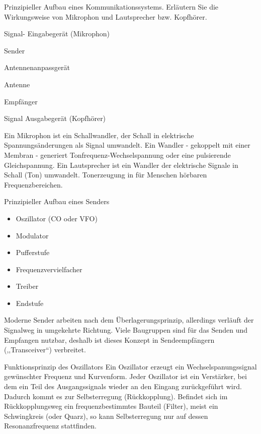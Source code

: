 \documentclass[avery5371,grid,frame,a4paper]{flashcards}
\newcommand{\card}[3]{
  \begin{flashcard}[{\chap} -- #1]{#2}#3\end{flashcard}
}
\begin{document}
\card{09}{Prinzipieller Aufbau eines Kommunikationssystems. Erläutern Sie die Wirkungsweise von Mikrophon und Lautsprecher bzw. Kopfhörer.}{
  \small
  \begin{itemize*}
    \item Signal- Eingabegerät (Mikrophon)
    \item Sender
    \item Antennenanpassgerät
    \item Antenne
    \item Empfänger
    \item Signal Ausgabegerät (Kopfhörer)
  \end{itemize*}
  \vspace{10pt}

  Ein Mikrophon ist ein Schallwandler, der Schall in elektrische Spannungsänderungen als Signal umwandelt. Ein Wandler - gekoppelt mit einer Membran - generiert Tonfrequenz-Wechselspannung oder eine pulsierende Gleichspannung. Ein Lautsprecher ist ein Wandler der elektrische Signale in Schall (Ton) umwandelt. Tonerzeugung in für Menschen hörbaren Frequenzbereichen.
}
\card{11}{Prinzipieller Aufbau eines Senders}{
  \small
  \begin{minipage}{0.4\textwidth}
  \begin{itemize}
    \item Oszillator (CO oder VFO)
    \item Modulator
    \item Pufferstufe
  \end{itemize}
  \end{minipage}
  \begin{minipage}{0.5\textwidth}
  \begin{itemize}
    \item Frequenzvervielfacher
    \item Treiber
    \item Endstufe
  \end{itemize}
  \end{minipage}
  \vspace{10pt}

  Moderne Sender arbeiten nach dem Überlagerungsprinzip, allerdings verläuft der Signalweg in umgekehrte Richtung. Viele Baugruppen sind für das Senden und Empfangen nutzbar, deshalb ist dieses Konzept in Sendeempfängern (,,Transceiver``) verbreitet.
}
\card{12}{Funktionsprinzip des Oszillators}{
  Ein Oszillator erzeugt ein Wechselspanungssignal gewünschter Frequenz und Kurvenform.
  Jeder Oszillator ist ein Verstärker, bei dem ein Teil des Ausgangssignals wieder an den Eingang zurückgeführt wird. Dadurch kommt es zur Selbsterregung (Rückkopplung). Befindet sich im Rückkopplungsweg ein frequenzbestimmtes Bauteil (Filter), meist ein Schwingkreis (oder Quarz), so kann Selbsterregung nur auf dessen Resonanzfrequenz stattfinden.
}
\end{document}
